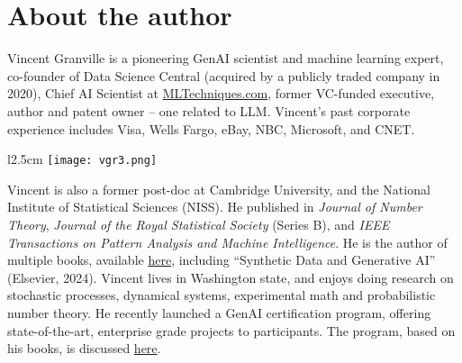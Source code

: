 \documentclass[oneside,10pt]{book}
\begin{document}


\section*{About the author}

Vincent Granville is a pioneering GenAI scientist and machine learning expert, co-founder of Data Science Central
(acquired by a publicly traded company in 2020),
 Chief AI Scientist at \href{https://mltechniques.com/}{MLTechniques.com}, former VC-funded executive, author and patent owner -- one related to LLM.
Vincent’s past corporate experience includes Visa, Wells Fargo, eBay, NBC, Microsoft, and CNET.


\begin{wrapfigure}{l}{2.5cm}
\texttt{[image: vgr3.png]}
\end{wrapfigure}

\noindent Vincent is also a former post-doc at Cambridge University, and the National Institute of Statistical Sciences (NISS).
He  published in {\em Journal of Number Theory}, {\em Journal of the Royal Statistical Society} (Series B), and {\em IEEE Transactions on Pattern Analysis and Machine Intelligence}. He is the author of multiple books, available \href{https://mltechniques.com/resources/}{here},
 including ``Synthetic Data and Generative AI'' (Elsevier, 2024). Vincent lives  in Washington state, and enjoys doing research on stochastic processes, dynamical systems, experimental math and probabilistic number theory. He recently launched a GenAI certification program,
 offering state-of-the-art, enterprise grade projects to participants. The program, based on his books, is discussed \href{https://mltblog.com/3pWxvZK}{here}.


%


\hypersetup{linkcolor=red}
\tableofcontents


\end{document}

